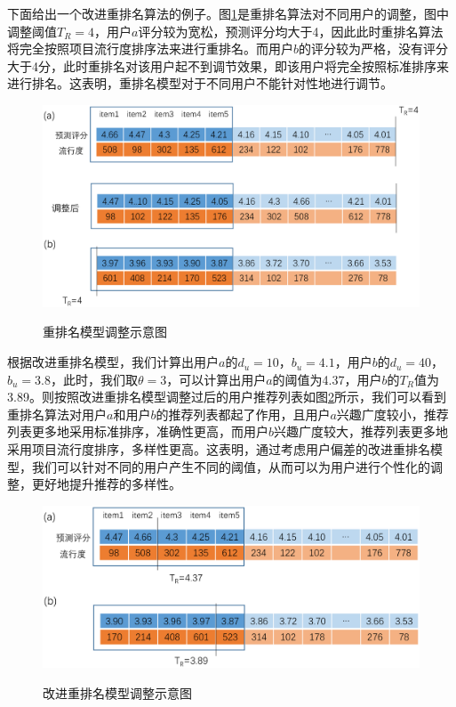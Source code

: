 \documentclass[master,winfonts]{njuthesis}
\begin{document}
下面给出一个改进重排名算法的例子。图\ref{fig:4-3}是重排名算法对不同用户的调整，图中调整阈值$T_R = 4$，用户$a$评分较为宽松，预测评分均大于4，因此此时重排名算法将完全按照项目流行度排序法来进行重排名。而用户$b$的评分较为严格，没有评分大于4分，此时重排名对该用户起不到调节效果，即该用户将完全按照标准排序来进行排名。这表明，重排名模型对于不同用户不能针对性地进行调节。
\begin{figure}[htbp]
  \centering
  \includegraphics[width=\textwidth]{rerank001_2.eps}\\
  \caption{重排名模型调整示意图}\label{fig:4-3}
\end{figure}
根据改进重排名模型，我们计算出用户$a$的$d_u = 10$，$b_u = 4.1$，用户$b$的$d_u = 40$，$b_u = 3.8$，此时，我们取$\theta = 3$，可以计算出用户$a$的阈值为4.37，用户$b$的$T_R$值为3.89。则按照改进重排名模型调整过后的用户推荐列表如图\ref{fig:4-4}所示，我们可以看到重排名算法对用户$a$和用户$b$的推荐列表都起了作用，且用户$a$兴趣广度较小，推荐列表更多地采用标准排序，准确性更高，而用户$b$兴趣广度较大，推荐列表更多地采用项目流行度排序，多样性更高。这表明，通过考虑用户偏差的改进重排名模型，我们可以针对不同的用户产生不同的阈值，从而可以为用户进行个性化的调整，更好地提升推荐的多样性。
\begin{figure}[htbp]
  \centering
  \includegraphics[width=\textwidth]{rerank_final_3.eps}\\
  \caption{改进重排名模型调整示意图}\label{fig:4-4}
\end{figure}
\end{document}
